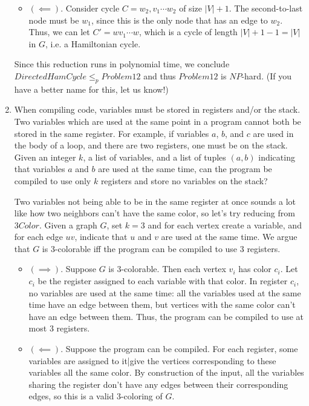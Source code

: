 \documentclass[fleqn]{article}
\begin{document}
\begin{enumerate}
\begin{answer}
\begin{itemize}
            \item $(\impliedby)$. Consider cycle $C = w_2,v_1 \cdots w_2$ of size $|V| + 1$. The second-to-last node must be $w_1$, since this is the only node that has an edge to $w_2$. Thus, we can let $C' = wv_1 \cdots w$, which is a cycle of length $|V| + 1 - 1 = |V|$ in $G$, i.e. a Hamiltonian cycle.
        \end{itemize}
        Since this reduction runs in polynomial time, we conclude $DirectedHamCycle \leq_p Problem12$ and thus $Problem12$ is $NP$-hard. (If you have a better name for this, let us know!)
    \end{answer}
    \item When compiling code, variables must be stored in registers and/or the stack. Two variables which are used at the same point in a program cannot both be stored in the same register. For example, if variables $a$, $b$, and $c$ are used in the body of a loop, and there are two registers, one must be on the stack. Given an integer $k$, a list of variables, and a list of tuples $(a,b)$ indicating that variables $a$ and $b$ are used at the same time, can the program be compiled to use only $k$ registers and store no variables on the stack?
    \begin{answer}
        Two variables not being able to be in the same register at once sounds a lot like how two neighbors can't have the same color, so let's try reducing from $3Color$. Given a graph $G$, set $k=3$ and for each vertex create a variable, and for each edge $uv$, indicate that $u$ and $v$ are used at the same time. We argue that $G$ is 3-colorable iff the program can be compiled to use $3$ registers.
        \begin{itemize}
            \item $(\implies)$. Suppose $G$ is $3$-colorable. Then each vertex $v_i$ has color $c_i$. Let $c_i$ be the register assigned to each variable with that color. In register $c_i$, no variables are used at the same time: all the variables used at the same time have an edge between them, but vertices with the same color can't have an edge between them. Thus, the program can be compiled to use at most $3$ registers.
            \item $(\impliedby)$. Suppose the program can be compiled. For each register, some variables are assigned to it|give the vertices corresponding to these variables all the same color. By construction of the input, all the variables sharing the register don't have any edges between their corresponding edges, so this is a valid 3-coloring of $G$.

\end{itemize}
\end{answer}
\end{enumerate}
\end{document}
